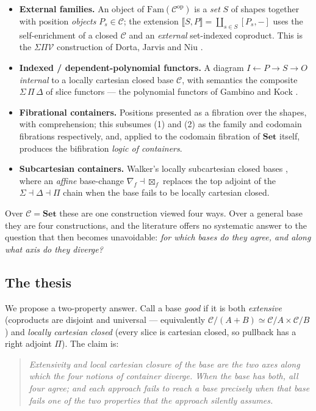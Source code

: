 \documentclass[11pt]{amsart}
\theoremstyle{plain}
\theoremstyle{definition}
\theoremstyle{remark}
\newcommand{\C}{\mathcal{C}}
\newcommand{\Set}{\mathbf{Set}}
\newcommand{\Fam}{\mathrm{Fam}}
\newcommand{\ext}[1]{\llbracket #1 \rrbracket}
\newcommand{\ihom}[2]{[#1,#2]}
\newcommand{\op}{\mathrm{op}}
\newcommand{\coprodd}{\textstyle\coprod}
\begin{document}
\begin{itemize}
\item[(1)] \textbf{External families.} An object of $\Fam(\C^\op)$ is a \emph{set} $S$ of shapes
together with position \emph{objects} $P_s\in\C$; the extension $\ext{S,P}=\coprodd_{s\in S}\ihom{P_s}{-}$
uses the self-enrichment of a closed $\C$ and an \emph{external} set-indexed coproduct. This is the
$\Sigma\Pi\mathcal{V}$ construction of Dorta, Jarvis and Niu \cite{DJN}.
\item[(2)] \textbf{Indexed / dependent-polynomial functors.} A diagram $I\leftarrow P\rightarrow S\rightarrow O$
\emph{internal} to a locally cartesian closed base $\C$, with semantics the composite
$\Sigma\,\Pi\,\Delta$ of slice functors --- the polynomial functors of Gambino and Kock \cite{GambinoKock}.
\item[(3)] \textbf{Fibrational containers.} Positions presented as a fibration over the shapes,
with comprehension; this subsumes (1) and (2) as the family and codomain fibrations respectively, and,
applied to the codomain fibration of $\Set$ itself, produces the bifibration \emph{logic of
containers}.
\item[(4)] \textbf{Subcartesian containers.} Walker's locally subcartesian closed bases \cite{Walker},
where an \emph{affine} base-change $\nabla_f\dashv\boxtimes_f$ replaces the top adjoint of the
$\Sigma\dashv\Delta\dashv\Pi$ chain when the base fails to be locally cartesian closed.
\end{itemize}

Over $\C=\Set$ these are one construction viewed four ways. Over a general base they are four
constructions, and the literature offers no systematic answer to the question that then becomes
unavoidable: \emph{for which bases do they agree, and along what axis do they diverge?}

\subsection{The thesis}
We propose a two-property answer. Call a base \emph{good} if it is both \emph{extensive}
(coproducts are disjoint and universal --- equivalently $\C/(A+B)\simeq \C/A\times\C/B$) and
\emph{locally cartesian closed} (every slice is cartesian closed, so pullback has a right adjoint
$\Pi$). The claim is:

\begin{quote}
\emph{Extensivity and local cartesian closure of the base are the two axes along which the four
notions of container diverge. When the base has both, all four agree; and each approach fails to
reach a base precisely when that base fails one of the two properties that the approach silently
assumes.}
\end{quote}
\end{document}
